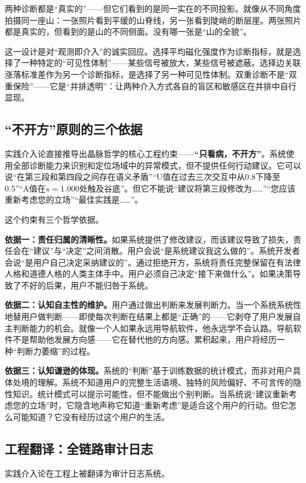 \documentclass[11pt,a4paper]{book}
\theoremstyle{definition}
\begin{document}
两种诊断都是“真实的”——但它们看到的是同一实在的不同投影。就像从不同角度拍摄同一座山：一张照片看到平缓的山脊线，另一张看到陡峭的断层崖。两张照片都是真实的，但看到的是山的不同侧面。没有哪一张是“山的全貌”。

这一设计是对“观测即介入”的诚实回应。选择平均磁化强度作为诊断指标，就是选择了一种特定的“可见性体制”——某些信号被放大，某些信号被遮蔽。选择边关联涨落标准差作为另一个诊断指标，是选择了另一种可见性体制。双重诊断不是“双重保险”——它是“并排透明”：让两种介入方式各自的盲区和敏感区在并排中自行显现。

\subsection{“不开方”原则的三个依据}

实践介入论直接推导出晶脉哲学的核心工程约束——\textbf{“只看病，不开方”}。系统使用全部诊断能力来识别和定位场域中的异常模式，但不提供任何行动建议。它可以说“在第三段和第四段之间存在语义矛盾”“U值在过去三次交互中从0.8下降至0.5”“A值在$s=1.000$处触及谷底”。但它不能说“建议将第三段修改为……”“您应该重新考虑您的立场”“最佳实践是……”。

这个约束有三个哲学依据。

\textbf{依据一：责任归属的清晰性。}如果系统提供了修改建议，而该建议导致了损失，责任会在“建议”与“决定”之间消散。用户会说“是系统建议我这么做的”。系统开发者会说“是用户自己决定采纳建议的”。通过拒绝开方，系统将责任完整保留在有法律人格和道德人格的人类主体手中。用户必须自己决定“接下来做什么”。如果决策导致了不好的后果，用户不能归咎于系统。

\textbf{依据二：认知自主性的维护。}用户通过做出判断来发展判断力。当一个系统系统性地替用户做判断——即使每次判断在结果上都是“正确”的——它剥夺了用户发展自主判断能力的机会。就像一个人如果永远用导航软件，他永远学不会认路。导航软件不是帮助他发展方向感——它在替代他的方向感。累积起来，用户将经历一种“判断力萎缩”的过程。

\textbf{依据三：认知谦逊的体现。}系统的“判断”基于训练数据的统计模式，而非对用户具体处境的理解。系统不知道用户的完整生活语境、独特的风险偏好、不可言传的隐性知识。统计模式可以提示可能性，但不能做出个别判断。当系统说“建议重新考虑您的立场”时，它隐含地声称它知道“重新考虑”是适合这个用户的行动。但它怎么可能知道？它没有经历过这个用户的生活。

\subsection{工程翻译：全链路审计日志}

实践介入论在工程上被翻译为审计日志系统。
\end{document}

